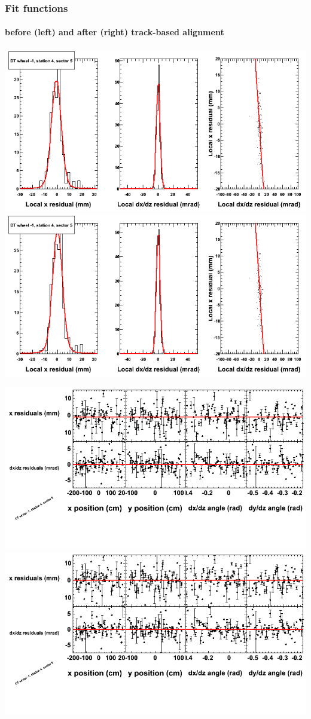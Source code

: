 \documentclass[compress]{beamer}
\begin{document}
\begin{frame}
\frametitle{Fit functions}
\framesubtitle{before (left) and after (right) track-based alignment}
\includegraphics[width=0.5\linewidth]{fitfunctions_re01/MBwhBst4sec05_bellcurves.png} \includegraphics[width=0.5\linewidth]{fitfunctions_re05/MBwhBst4sec05_bellcurves.png}

\includegraphics[width=0.5\linewidth]{fitfunctions_re01/MBwhBst4sec05_polynomials.png} \includegraphics[width=0.5\linewidth]{fitfunctions_re05/MBwhBst4sec05_polynomials.png}
\end{frame}
\end{document}
